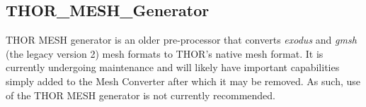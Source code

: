 \subsection{THOR\_MESH\_Generator}

THOR MESH generator is an older pre-processor that converts \textit{exodus} and \textit{gmsh} (the legacy version 2) mesh formats to THOR's native mesh format.
It is currently undergoing maintenance and will likely have important capabilities simply added to the Mesh Converter after which it may be removed.
As such, use of the THOR MESH generator is not currently recommended.



